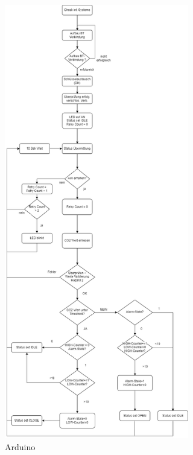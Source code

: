 \begin{figure}[h]
	\includegraphics[height=190mm,left]{IDP_Designdokument/images/ablaufdiag_adriuno.drawio.png}
	\centering
	\caption{Arduino}
	\label{fig:system}
\end{figure}